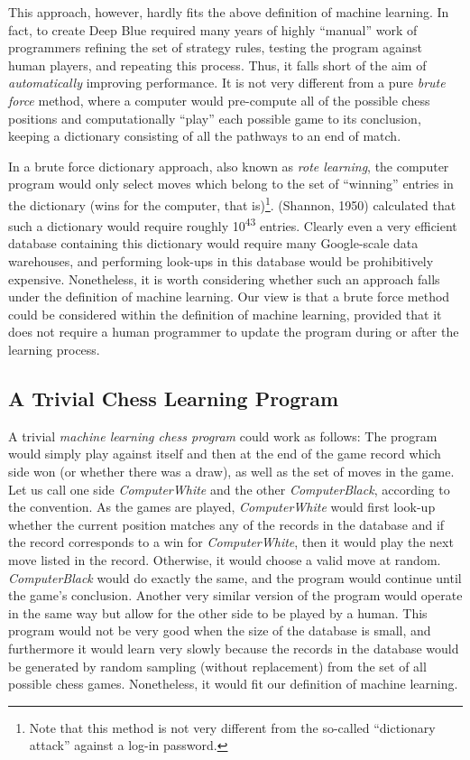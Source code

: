 This approach, however, hardly fits the above definition of machine learning. In fact, to create Deep Blue required many years of highly ``manual'' work of programmers refining the set of strategy rules, testing the program against human players, and repeating this process. Thus, it falls short of the aim of \emph{automatically} improving performance. It is not very different from a pure \emph{brute force} method, where a computer would pre-compute all of the possible chess positions and computationally ``play'' each possible game to its conclusion, keeping a dictionary consisting of all the pathways to an end of match.

In a brute force dictionary approach, also known as \emph{rote learning}, the computer program would only select moves which belong to the set of ``winning'' entries in the dictionary (wins for the computer, that is)\footnote{Note that this method is not very different from the so-called ``dictionary attack'' against a log-in password.}. (Shannon, 1950) calculated that such a dictionary would require roughly 10\textsuperscript{43} entries. Clearly even a very efficient database containing this dictionary would require many Google-scale data warehouses, and performing look-ups in this database would be prohibitively expensive. Nonetheless, it is worth considering whether such an approach falls under the definition of machine learning. Our view is that a brute force method could be considered within the definition of machine learning, provided that it does not require a human programmer to update the program during or after the learning process.

\subsection{A Trivial Chess Learning Program}
\label{sec:trivial-learning}

A trivial \emph{machine learning chess program} could work as follows: The program would simply play against itself and then at the end of the game record which side won (or whether there was a draw), as well as the set of moves in the game. Let us call one side \emph{ComputerWhite} and the other \emph{ComputerBlack}, according to the convention. As the games are played, \emph{ComputerWhite} would first look-up whether the current position matches any of the records in the database and if the record corresponds to a win for \emph{ComputerWhite}, then it would play the next move listed in the record.  Otherwise, it would choose a valid move at random. \emph{ComputerBlack} would do exactly the same, and the program would continue until the game's conclusion. Another very similar version of the program would operate in the same way but allow for the other side to be played by a human. This program would not be very good when the size of the database is small, and furthermore it would learn very slowly because the records in the database would be generated by random sampling (without replacement) from the set of all possible chess games. Nonetheless, it would fit our definition of machine learning.

